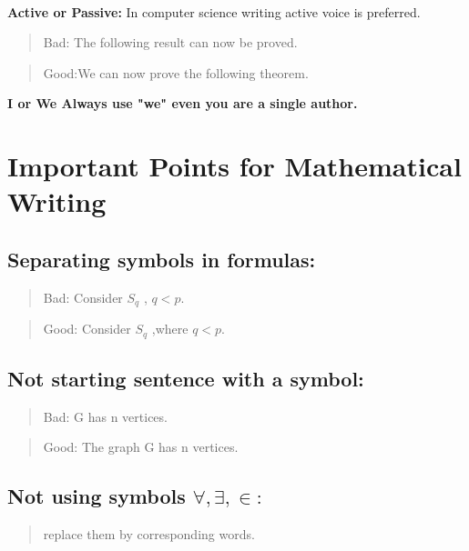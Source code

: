 \documentclass[]{report}
\begin{document}
\begin{description}
\paragraph{}
\textbf{\large Active or Passive:}
In computer science writing active voice is
preferred.
\begin{verse}
{\large Bad:} The following result can now be
proved.
\end{verse}
\begin{verse}
{\large Good:}We can now prove the following
theorem.
\end{verse}
\begin{center}
\textbf{{\large I or We Always use "we" even you are a single author.}}
\end{center}
\end{description}

\section{Important Points for Mathematical Writing}
\subsection{Separating symbols in formulas:}
\begin{verse}
{\large Bad:} Consider \begin{math}
{S_q}
\end{math} , $q < p.$
\end{verse}
\begin{verse}
{\large Good:} Consider \begin{math}
{S_q}
\end{math} ,where $q < p.$
\end{verse}

\subsection{Not starting sentence with a symbol:}
\begin{verse}
{\large Bad:} G has n vertices.
\end{verse}
\begin{verse}
{\large Good:} The graph G has n vertices.
\end{verse}

\subsection{Not using symbols $ \forall, \exists ,\in : $}
\begin{verse}
replace them by corresponding
words.
\end{verse}
\end{document}

